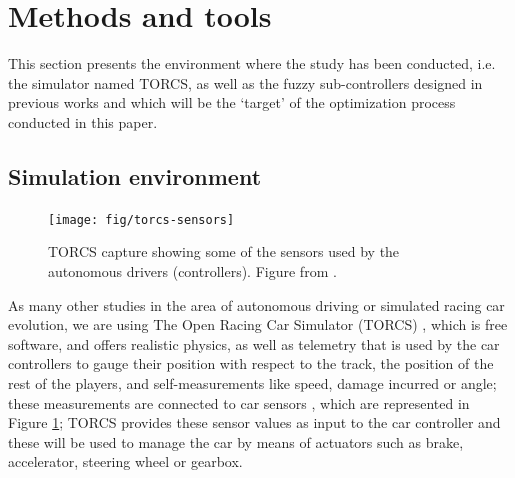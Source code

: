 \documentclass[10pt,journal,compsoc]{IEEEtran}
\begin{document}

\section{Methods and tools}
\label{sec:methods}

This section presents the environment where the study has been conducted, i.e. the simulator named TORCS, as well as the fuzzy sub-controllers designed in previous works and which will be the `target' of the optimization process conducted in this paper. 

%
\subsection{Simulation environment}

\begin{figure}[!ht] 
	\begin{center}
		\texttt{[image: fig/torcs-sensors]}
		\caption {TORCS capture showing some of the sensors
                used by the autonomous drivers (controllers). Figure from \cite{DBLP:conf/cig/SalemMG19}.}
		\label{fig:torcs-sensors}
	\end{center}
\end{figure}

As many other studies in the area of autonomous driving or simulated
racing car evolution, we are using The Open Racing Car Simulator
(TORCS) \cite{torcs4}, which is free software, and offers realistic
physics, as well as telemetry that is used by the car controllers to
gauge their position with respect to the track, the position of the
rest of the players, and self-measurements like speed, damage incurred
or angle; these measurements are connected to car sensors \cite{manualTORCS}, which are represented in Figure \ref{fig:torcs-sensors}; TORCS provides
these sensor values as input to the car controller and these will be
used to manage the car by means of actuators such as brake,
accelerator, steering wheel or gearbox. 

\end{document}
